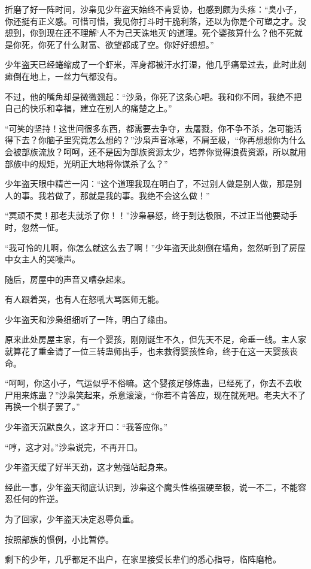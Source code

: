 \begin{this_body}
折磨了好一阵时间，沙枭见少年盗天始终不肯妥协，也感到颇为头疼：“臭小子，你还挺有正义感。可惜可惜，我见你打斗时干脆利落，还以为你是个可塑之才。没想到，你到现在还不理解‘人不为己天诛地灭’的道理。死个婴孩算什么？他不死就是你死，你死了什么财富、欲望都成了空。你好好想想。”

少年盗天已经蜷缩成了一个虾米，浑身都被汗水打湿，他几乎痛晕过去，此时此刻瘫倒在地上，一丝力气都没有。

不过，他的嘴角却是微微翘起：“沙枭，你死了这条心吧。我和你不同，我绝不把自己的快乐和幸福，建立在别人的痛楚之上。”

“可笑的坚持！这世间很多东西，都需要去争夺，去屠戮，你不争不杀，怎可能活得下去？你脑子里究竟怎么想的？”沙枭声音冰寒，不屑至极，“你再想想你为什么会被部族流放？呵呵，还不是因为部族资源太少，培养你觉得浪费资源，所以就用部族中的规矩，光明正大地将你谋杀了么？”

少年盗天眼中精芒一闪：“这个道理我现在明白了，不过别人做是别人做，那是别人的事。我若做了，那就是我的事。我绝不会这么做！”

“冥顽不灵！那老夫就杀了你！！”沙枭暴怒，终于到达极限，不过正当他要动手时，忽然一怔。

“我可怜的儿啊，你怎么就这么去了啊！”少年盗天此刻倒在墙角，忽然听到了房屋中女主人的哭嚎声。

随后，房屋中的声音又嘈杂起来。

有人跟着哭，也有人在怒吼大骂医师无能。

少年盗天和沙枭细细听了一阵，明白了缘由。

原来此处房屋主家，有一个婴孩，刚刚诞生不久，但先天不足，命垂一线。主人家就算花了重金请了一位三转蛊师出手，也未救得婴孩性命，终于在这一天婴孩丧命。

“呵呵，你这小子，气运似乎不俗嘛。这个婴孩足够炼蛊，已经死了，你去不去收尸用来炼蛊？”沙枭笑起来，杀意滚滚，“你若不肯答应，现在就死吧。老夫大不了再换一个棋子罢了。”

少年盗天沉默良久，这才开口：“我答应你。”

“哼，这才对。”沙枭说完，不再开口。

少年盗天缓了好半天劲，这才勉强站起身来。

经此一事，少年盗天彻底认识到，沙枭这个魔头性格强硬至极，说一不二，不能容忍任何的忤逆。

为了回家，少年盗天决定忍辱负重。

按照部族的惯例，小比暂停。

剩下的少年，几乎都足不出户，在家里接受长辈们的悉心指导，临阵磨枪。


\end{this_body}

